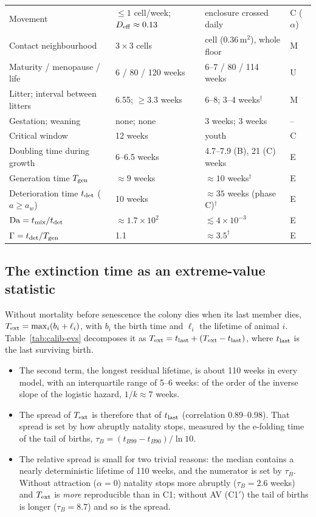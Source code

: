 \begin{table}[t]
\begin{tabular}{@{}llll@{}}
    Movement & $\le1$ cell/week; $D_{\rm eff}\approx0.13$ & enclosure crossed daily & C ($\alpha$) \\
    Contact neighbourhood & $3\times3$ cells & cell (0.36\,m$^2$), whole floor & M \\
    Maturity / menopause / life & 6 / 80 / 120 weeks & 6--7 / 80 / 114 weeks & U \\
    Litter; interval between litters & 6.55; $\ge3.3$ weeks & 6--8; 3--4 weeks$^\dagger$ & M \\
    Gestation; weaning & none; none & 3 weeks; 3 weeks & -- \\
    Critical window & 12 weeks & youth & C \\
    Doubling time during growth & 6--6.5 weeks & 4.7--7.9 (B), 21 (C) weeks & E \\
    Generation time $T_{\rm gen}$ & $\approx9$ weeks & $\approx10$ weeks$^\dagger$ & E \\
    Deterioration time $t_{\rm det}$ ($a\ge a_w$) & 10 weeks & $\approx35$ weeks (phase C)$^\dagger$ & E \\
    $\mathrm{Da}=t_{\rm mix}/t_{\rm det}$ & $\approx1.7\times10^2$ & $\lesssim4\times10^{-3}$ & E \\
    $\Gamma=t_{\rm det}/T_{\rm gen}$ & 1.1 & $\approx3.5^\dagger$ & E \\
    \bottomrule
  \end{tabular}
\end{table}

\subsection{The extinction time as an extreme-value statistic}
\label{app:calib-evs}

Without mortality before senescence the colony dies when its last member dies, $T_{\rm ext}=\max_i(b_i+\ell_i)$,
with $b_i$ the birth time and $\ell_i$ the lifetime of animal $i$. Table~\ref{tab:calib-evs} decomposes it as
$T_{\rm ext}=t_{\rm last}+(T_{\rm ext}-t_{\rm last})$, where $t_{\rm last}$ is the last surviving birth.
\begin{itemize}
  \item The second term, the longest residual lifetime, is about 110 weeks in every model, with an interquartile
    range of 5--6 weeks: of the order of the inverse slope of the logistic hazard, $1/k\approx7$ weeks.
  \item The spread of $T_{\rm ext}$ is therefore that of $t_{\rm last}$ (correlation 0.89--0.98). That spread is set
    by how abruptly natality stops, measured by the e-folding time of the tail of births,
    $\tau_B=(t_{B99}-t_{B90})/\ln10$.
  \item The relative spread is small for two trivial reasons: the median contains a nearly deterministic lifetime of
    110 weeks, and the numerator is set by $\tau_B$. Without attraction ($\alpha=0$) natality stops more abruptly
    ($\tau_B=2.6$ weeks) and $T_{\rm ext}$ is \emph{more} reproducible than in \textsf{C1}; without AV (\textsf{C1}$'$)
    the tail of births is longer ($\tau_B=8.7$) and so is the spread.
\end{itemize}

